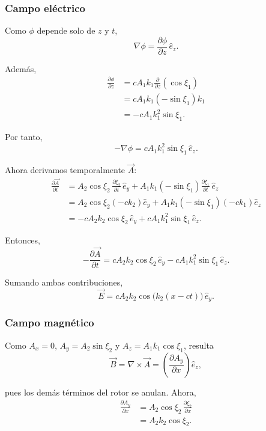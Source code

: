 \documentclass{article}
\numberwithin{equation}{section}
\begin{document}
\subsubsection{Campo eléctrico}
Como $\phi$ depende solo de $z$ y $t$,
\begin{equation}
\nabla\phi=\frac{\partial\phi}{\partial z}\,\hat e_z.
\end{equation}

Además,
\begin{align}
\frac{\partial\phi}{\partial z}
&=cA_1k_1\frac{\partial}{\partial z}(\cos\xi_1) \\
&=cA_1k_1(-\sin\xi_1)k_1 \\
&=-cA_1k_1^2\sin\xi_1.
\end{align}

Por tanto,
\begin{equation}
-\nabla\phi=cA_1k_1^2\sin\xi_1\,\hat e_z.
\end{equation}

Ahora derivamos temporalmente $\vec A$:
\begin{align}
\frac{\partial\vec A}{\partial t}
&=A_2\cos\xi_2\,\frac{\partial\xi_2}{\partial t}\,\hat e_y + A_1k_1(-\sin\xi_1)\frac{\partial\xi_1}{\partial t}\,\hat e_z \\
&=A_2\cos\xi_2(-ck_2)\hat e_y + A_1k_1(-\sin\xi_1)(-ck_1)\hat e_z \\
&=-cA_2k_2\cos\xi_2\,\hat e_y + cA_1k_1^2\sin\xi_1\,\hat e_z.
\end{align}

Entonces,
\begin{equation}
-\frac{\partial\vec A}{\partial t}=cA_2k_2\cos\xi_2\,\hat e_y-cA_1k_1^2\sin\xi_1\,\hat e_z.
\end{equation}

Sumando ambas contribuciones,
\begin{equation}
\boxed{\vec E=cA_2k_2\cos\big(k_2(x-ct)\big)\,\hat e_y.}
\end{equation}

\subsubsection{Campo magnético}
Como $A_x=0$, $A_y=A_2\sin\xi_2$ y $A_z=A_1k_1\cos\xi_1$, resulta
\begin{equation}
\vec B=\nabla\times\vec A = \left(\frac{\partial A_y}{\partial x}\right)\hat e_z,
\end{equation}

pues los demás términos del rotor se anulan. Ahora,
\begin{align}
\frac{\partial A_y}{\partial x}
&=A_2\cos\xi_2\,\frac{\partial\xi_2}{\partial x} \\
&=A_2k_2\cos\xi_2.
\end{align}
\end{document}
